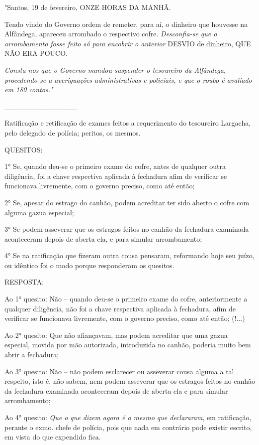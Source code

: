 "Santos, 19 de fevereiro, ONZE HORAS DA MANHÃ.

Tendo vindo do Governo ordem de remeter, para aí, o dinheiro que
houvesse na Alfândega, apareceu arrombado o respectivo cofre.
\emph{Desconfia-se que o arrombamento fosse feito só para encobrir o
anterior} DESVIO de dinheiro, QUE NÃO ERA POUCO.

\emph{Consta-nos que o Governo mandou suspender o tesoureiro da
Alfândega, procedendo-se a averiguações administrativas e policiais, e
que o roubo é avaliado em 180 contos."}

\emph{\_\_\_\_\_\_\_\_\_\_\_\_\_\_}

Ratificação e retificação de exames feitos a requerimento do tesoureiro
Largacha, pelo delegado de polícia; peritos, os mesmos.

QUESITOS:

1° Se, quando deu-se o primeiro exame do cofre, antes de qualquer outra
diligência, foi a chave respectiva aplicada à fechadura afim de
verificar se funcionava livremente, com o governo preciso, como até
então;

2° Se, apesar do estrago do canhão, podem acreditar ter sido aberto o
cofre com alguma gazua especial;

3° Se podem asseverar que os estragos feitos no canhão da fechadura
examinada aconteceram depois de aberta ela, e para simular arrombamento;

4° Se na ratificação que fizeram outra cousa pensaram, reformando hoje
seu juízo, ou idêntico foi o modo porque responderam os quesitos.

RESPOSTA:

Ao 1° quesito: Não -- quando deu-se o primeiro exame do cofre,
anteriormente a qualquer diligência, não foi a chave respectiva aplicada
à fechadura, afim de verificar se funcionava livremente, com o governo
preciso, como até então; (!...)

Ao 2° quesito: Que não afiançavam, mas podem acreditar que uma gazua
especial, movida por mão autorizada, introduzida no canhão, poderia
muito bem abrir a fechadura;

Ao 3° quesito: Não -- não podem esclarecer ou asseverar cousa alguma a
tal respeito, isto é, não sabem, nem podem asseverar que os estragos
feitos no canhão da fechadura examinada aconteceram depois de aberta ela
e para simular arrombamento;

Ao 4° quesito: \emph{Que o que dizem agora é o mesmo que declararam}, em
ratificação, perante o exmo. chefe de polícia, pois que nada em
contrário pode existir escrito, em vista do que expendido fica.

